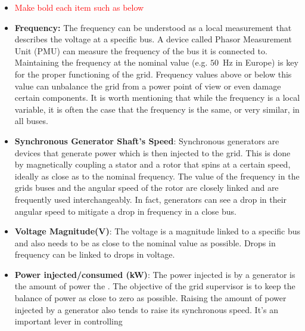 \documentclass{article}
\begin{document}
\begin{itemize}
    \item \textcolor{red}{Make bold each item such as below}
    \item \textbf{Frequency:} The frequency can be understood as a local measurement that describes the voltage at a specific bus. A device called Phasor Measurement Unit (PMU) can measure the frequency of the bus it is connected to. Maintaining the frequency at the nominal value (e.g. $50$~Hz in Europe) is key for the proper functioning of the grid. Frequency values above or below this value can unbalance the grid from a power point of view or even damage certain components. It is worth mentioning that while the frequency is a local variable, it is often the case that the frequency is the same, or very similar, in all buses.   
    \item \textbf{Synchronous Generator Shaft's Speed}: Synchronous generators are devices that generate power which is then injected to the grid. This is done by magnetically coupling a stator and a rotor that spins at a certain speed, ideally as close as to the nominal frequency. The value of the frequency in the grids buses and the angular speed of the rotor are closely linked and are frequently used interchangeably. In fact, generators can see a drop in their angular speed to mitigate a drop in frequency in a close bus.
    \item \textbf{Voltage Magnitude(V)}: The voltage is a magnitude linked to a specific bus and also needs to be as close to the nominal value as possible. Drops in frequency can be linked to drops in voltage.
    \item \textbf{Power injected/consumed (kW)}: The power injected is by a generator is the amount of power the . The objective of the grid supervisor is to keep the balance of power as close to zero as possible. Raising the amount of power injected by a generator also tends to raise its synchronous speed. It's an important lever in controlling  
\end{itemize}

\end{document}
